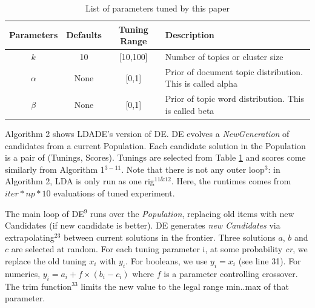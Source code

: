 \documentclass[twocolumn,5p,sort&compress]{elsarticle}
\theoremstyle{break}
\begin{document}
\begin{table}[!htbp]
    \begin{center}
\scriptsize
\begin{tabular}{|c|c|c|p{3.5cm}|}
        \hline 
        \textbf{Parameters} & \textbf{Defaults} & \textbf{Tuning Range} & \textbf{Description}\\
        \hline
        $k$ & 10 & [10,100] & Number of topics or cluster size \\ 
        \hline
       $\alpha$ & None & [0,1] & Prior of document topic distribution. This is called alpha \\ 
        \hline
        $\beta$ & None & [0,1] & Prior of topic word distribution. This is called  beta \\

        \hline
\end{tabular}

\end{center}
\caption{List of parameters tuned by this paper}
\label{tb:tuned}
\end{table}

Algorithm 2 shows LDADE's version of DE.  DE evolves a \textit{NewGeneration} of
candidates from a current Population.   Each candidate solution in the Population is a pair of
(Tunings, Scores). Tunings are selected from Table \ref{tb:tuned} and scores
come similarly from Algorithm 1$^{3-11}$. Note that there is not any outer loop$^{3}$: in Algorithm 2, LDA is only run as one rig$^{11 \& 12}$. Here, the runtimes comes from $\mathit{iter} * np * 10$ evaluations of tuned experiment.

The main loop of DE$^{9}$ runs over the \textit{Population}, replacing old items with new Candidates (if new candidate is better).
DE generates \textit{new Candidates} via 
extrapolating$^{23}$ between current solutions in the frontier. Three solutions $a$, $b$ and $c$ are
selected at random. For each tuning parameter i, at some probability \textit{cr}, we
replace the old tuning $x_i$ with $y_i$. For booleans, we use $y_i = x_i$ (see
line 31). For numerics, $y_i = a_i + f \times (b_i - c_i)$ where $f$ is a
parameter controlling crossover. The trim function$^{33}$ limits the new value
to the legal range min..max of that parameter.
\end{document}
